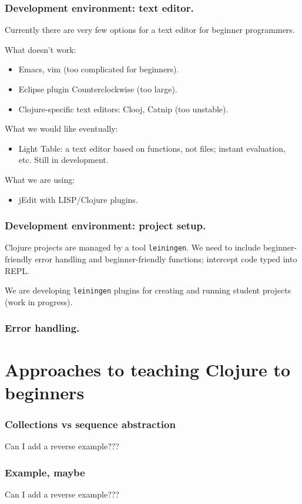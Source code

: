\documentclass{beamer}
\begin{document}
\begin{frame}
\frametitle{Development environment: text editor.}
Currently there are very few options for a text editor for beginner programmers. 

What doesn't work:
\begin{itemize}
\item Emacs, vim (too complicated for beginners).
\item Eclipse plugin Counterclockwise (too large).
\item Clojure-specific text editors: Clooj, Catnip (too unstable). 
\end{itemize}
What we would like eventually:
\begin{itemize}
\item Light Table: a text editor based on functions, not files; instant evaluation, etc. Still in development. 
\end{itemize}
What we are using:
\begin{itemize}
\item jEdit with LISP/Clojure plugins. 
\end{itemize}
\end{frame}

\begin{frame}
\frametitle{Development environment: project setup.}
Clojure projects are managed by a tool {\tt leiningen}. We need to include beginner-friendly error handling and beginner-friendly functions; intercept code typed into REPL. 

We are developing {\tt leiningen} plugins for creating and running student projects (work in progress). 
\end{frame}

\begin{frame}
\frametitle{Error handling.}

\end{frame}

\section{Approaches to teaching Clojure to beginners}

\begin{frame}
\frametitle{Collections vs sequence abstraction}
Can I add a reverse example???
\end{frame}

\begin{frame}
\frametitle{Example, maybe}
Can I add a reverse example???
\end{frame}
\end{document}
